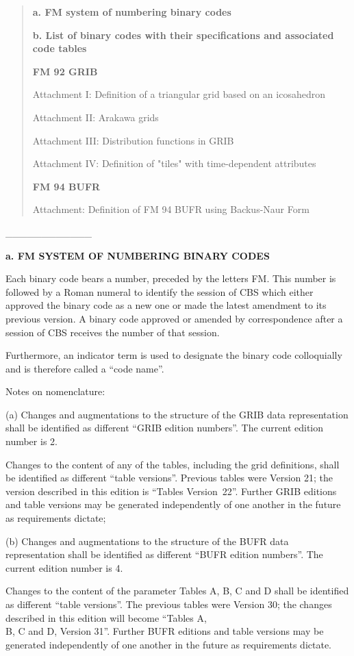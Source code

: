 \begin{quote}
\textbf{a. FM system of numbering binary codes}

\textbf{b. List of binary codes with their specifications and associated code tables}

\textbf{FM 92 GRIB}

Attachment I: Definition of a triangular grid based on an icosahedron

Attachment II: Arakawa grids

Attachment III: Distribution functions in GRIB

Attachment IV: Definition of "tiles" with time-dependent attributes

\textbf{FM 94 BUFR}

Attachment: Definition of FM 94 BUFR using Backus-Naur Form
\end{quote}

\_\_\_\_\_\_\_\_\_\_\_\_

\textbf{a. FM SYSTEM OF NUMBERING BINARY CODES}

Each binary code bears a number, preceded by the letters FM. This number is followed by a Roman numeral to identify the session of CBS which either approved the binary code as a new one or made the latest amendment to its previous version. A binary code approved or amended by correspondence after a session of CBS receives the number of that session.

Furthermore, an indicator term is used to designate the binary code colloquially and is therefore called a ``code name''.

Notes on nomenclature:

(a) Changes and augmentations to the structure of the GRIB data representation shall be identified as different ``GRIB edition numbers''. The current edition number is 2.

Changes to the content of any of the tables, including the grid definitions, shall be identified as different ``table versions''. Previous tables were Version 21; the version described in this edition is ``Tables Version~22''. Further GRIB editions and table versions may be generated independently of one another in the future as requirements dictate;

(b) Changes and augmentations to the structure of the BUFR data representation shall be identified as different ``BUFR edition numbers''. The current edition number is 4.

Changes to the content of the parameter Tables A, B, C and D shall be identified as different ``table versions''. The previous tables were Version 30; the changes described in this edition will become ``Tables A,\\
B, C and D, Version 31''. Further BUFR editions and table versions may be generated independently of one another in the future as requirements dictate.

